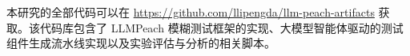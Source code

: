 \begin{appendix}

本研究的全部代码可以在 
\url{https://github.com/llipengda/llm-peach-artifacts} 
获取。该代码库包含了 LLMPeach 模糊测试框架的实现、大模型智能体驱动的测试组件生成流水线实现以及实验评估与分析的相关脚本。
\end{appendix}